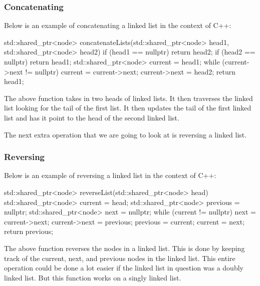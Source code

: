 \begin{highlight}

\subsubsection*{Concatenating}

Below is an example of concatenating a linked list in the context of C++:

\begin{code}
std::shared_ptr<node> concatenateLists(std::shared_ptr<node> head1, 
                                    std::shared_ptr<node> head2) {
    if (head1 == nullptr)
        return head2;
    if (head2 == nullptr)
        return head1;
    std::shared_ptr<node> current = head1;
    while (current->next != nullptr) {
        current = current->next;
    }
    current->next = head2;
    return head1;
}
\end{code}

The above function takes in two heads of linked lists. It then traverses the linked list looking for the tail of the first list. It then updates the tail of the first linked list and has it point to
the head of the second linked list. 

\end{highlight}

The next extra operation that we are going to look at is reversing a linked list.

\begin{highlight}

\subsubsection*{Reversing}

Below is an example of reversing a linked list in the context of C++:

\begin{code}
std::shared_ptr<node> reverseList(std::shared_ptr<node> head) {
    std::shared_ptr<node> current = head;
    std::shared_ptr<node> previous = nullptr;
    std::shared_ptr<node> next = nullptr;
    while (current != nullptr) {
        next = current->next;
        current->next = previous;
        previous = current;
        current = next;
    }
    return previous;
}
\end{code}

The above function reverses the nodes in a linked list. This is done by keeping track of the current, next, and previous nodes in the linked list. This entire operation could be done a lot easier if
the linked list in question was a doubly linked list. But this function works on a singly linked list.

\end{highlight}


